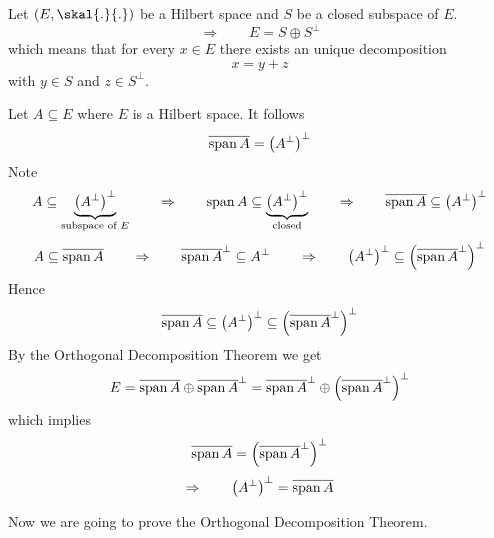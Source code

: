 
\begin{theorem}
	Let $(E, \skal{.}{.})$ be a Hilbert space and $S$ be a closed subspace of $E$. 
	\[
		\Rightarrow \qquad E = S \oplus S^{\perp}
	\]
	which means that for every $x \in E$ there exists an unique decomposition
	\[
		x = y + z
	\]
	with $y \in S$ and $z \in S^{\perp}$.
\end{theorem}
\begin{beispiel}
	Let $A \subseteq E$ where $E$ is a Hilbert space. It follows
	\[
		\overline{\operatorname{span}  A} = \left( A^{\perp} \right)^{\perp}
	\]
	Note 
	\[
		A \subseteq \underset{\text{subspace of $E$}}{\underbrace{ \left( A^{\perp} \right)^{\perp}}} \qquad \Rightarrow \qquad \operatorname{span}  A \subseteq 
		\underset{\text{closed}}{\underbrace{ \left( A^{\perp} \right)^{\perp}}} \qquad \Rightarrow \qquad \overline{\operatorname{span}  A} \subseteq 
		\left( A^{\perp} \right)^{\perp}
	\]
	\[
		A \subseteq \overline{\operatorname{span}  A} \qquad \Rightarrow \qquad \overline{\operatorname{span}  A}^{\perp} \subseteq A^{\perp} \qquad \Rightarrow \qquad 
		\left( A^{\perp} \right)^{\perp} \subseteq \left( \overline{\operatorname{span}  A}^{\perp} \right)^{\perp}
	\]
	Hence
	\[
		\overline{\operatorname{span}  A} \subseteq \left( A^{\perp} \right)^{\perp} \subseteq \left( \overline{\operatorname{span}  A}^{\perp} \right)^{\perp}
	\]
	By the Orthogonal Decomposition Theorem we get
	\[
		E = \overline{\operatorname{span}  A} \oplus \overline{\operatorname{span}  A}^{\perp} = \overline{\operatorname{span}  A}^{\perp} \oplus \left( \overline{\operatorname{span}  A}^{\perp} \right)^{\perp} 
	\]
	which implies
	\[
		\overline{\operatorname{span}  A} = \left( \overline{\operatorname{span}  A}^{\perp} \right)^{\perp}
	\]
	\[
		\Rightarrow \qquad \left( A^{\perp} \right)^{\perp} = \overline{\operatorname{span}  A}
	\]
\end{beispiel}

Now we are going to prove the Orthogonal Decomposition Theorem.

